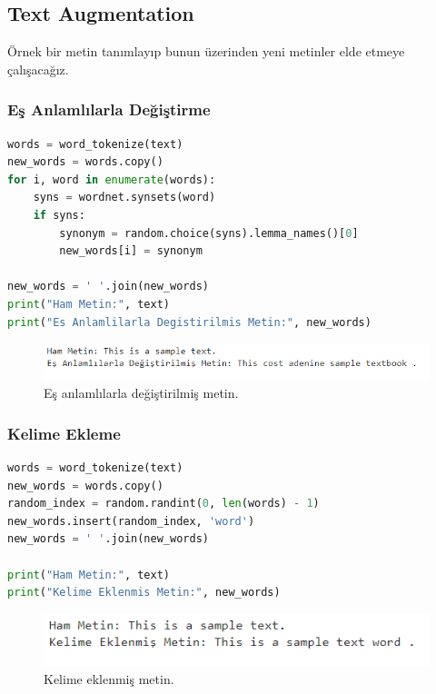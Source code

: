 \subsection{Text Augmentation}
Örnek bir metin tanımlayıp bunun üzerinden yeni metinler elde etmeye çalışacağız.

\subsubsection{Eş Anlamlılarla Değiştirme}

\begin{lstlisting}[language=Python]
words = word_tokenize(text)
new_words = words.copy()
for i, word in enumerate(words):
    syns = wordnet.synsets(word)
    if syns:
        synonym = random.choice(syns).lemma_names()[0]
        new_words[i] = synonym

new_words = ' '.join(new_words)
print("Ham Metin:", text)
print("Es Anlamlilarla Degistirilmis Metin:", new_words)
\end{lstlisting}

\begin{figure}[h]
    \centering
    \includegraphics[width=1\textwidth]{images/text_aug_01.png}
    \caption{Eş anlamlılarla değiştirilmiş metin.}
    \label{fig:enter-label}
\end{figure}

\newpage

\subsubsection{Kelime Ekleme}

\begin{lstlisting}[language=Python]
words = word_tokenize(text)
new_words = words.copy()
random_index = random.randint(0, len(words) - 1)
new_words.insert(random_index, 'word')
new_words = ' '.join(new_words)

print("Ham Metin:", text)
print("Kelime Eklenmis Metin:", new_words)
\end{lstlisting}

\begin{figure}[h]
    \centering
    \includegraphics[width=1\textwidth]{images/text_aug_02.png}
    \caption{Kelime eklenmiş metin.}
    \label{fig:enter-label}
\end{figure}

